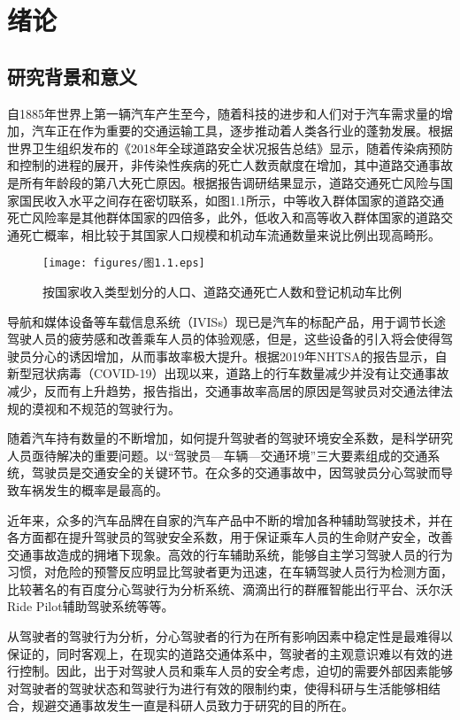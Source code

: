 \chapter{绪论}

\section{研究背景和意义}

自1885年世界上第一辆汽车产生至今，随着科技的进步和人们对于汽车需求量的增加，汽车正在作为重要的交通运输工具，逐步推动着人类各行业的蓬勃发展。根据世界卫生组织发布的《2018年全球道路安全状况报告总结》显示，随着传染病预防和控制的进程的展开，非传染性疾病的死亡人数贡献度在增加，其中道路交通事故是所有年龄段的第八大死亡原因。根据报告调研结果显示，道路交通死亡风险与国家国民收入水平之间存在密切联系，如图1.1所示，中等收入群体国家的道路交通死亡风险率是其他群体国家的四倍多，此外，低收入和高等收入群体国家的道路交通死亡概率，相比较于其国家人口规模和机动车流通数量来说比例出现高畸形。

\begin{figure}[!h]
	\centering
	\texttt{[image: figures/图1.1.eps]}\\
	\caption{按国家收入类型划分的人口、道路交通死亡人数和登记机动车比例}\label{图1.1}
\end{figure}


导航和媒体设备等车载信息系统（IVISs）现已是汽车的标配产品，用于调节长途驾驶人员的疲劳感和改善乘车人员的体验观感，但是，这些设备的引入将会使得驾驶员分心的诱因增加，从而事故率极大提升。根据2019年NHTSA的报告显示\cite{1}，自新型冠状病毒（COVID-19）出现以来，道路上的行车数量减少并没有让交通事故减少，反而有上升趋势，报告指出，交通事故率高居的原因是驾驶员对交通法律法规的漠视和不规范的驾驶行为。

随着汽车持有数量的不断增加，如何提升驾驶者的驾驶环境安全系数，是科学研究人员亟待解决的重要问题。以“驾驶员—车辆—交通环境”三大要素组成的交通系统，驾驶员是交通安全的关键环节。在众多的交通事故中，因驾驶员分心驾驶而导致车祸发生的概率是最高的\cite{2}。

近年来，众多的汽车品牌在自家的汽车产品中不断的增加各种辅助驾驶技术，并在各方面都在提升驾驶员的驾驶安全系数，用于保证乘车人员的生命财产安全，改善交通事故造成的拥堵下现象。高效的行车辅助系统，能够自主学习驾驶人员的行为习惯，对危险的预警反应明显比驾驶者更为迅速，在车辆驾驶人员行为检测方面，比较著名的有百度分心驾驶行为分析系统、滴滴出行的群雁智能出行平台、沃尔沃Ride Pilot辅助驾驶系统等等。

从驾驶者的驾驶行为分析，分心驾驶者的行为在所有影响因素中稳定性是最难得以保证的，同时客观上，在现实的道路交通体系中，驾驶者的主观意识难以有效的进行控制。因此，出于对驾驶人员和乘车人员的安全考虑，迫切的需要外部因素能够对驾驶者的驾驶状态和驾驶行为进行有效的限制约束，使得科研与生活能够相结合，规避交通事故发生一直是科研人员致力于研究的目的所在。

